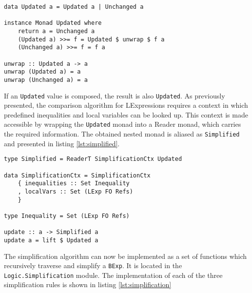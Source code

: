 \documentclass[12pt]{article}
\begin{document}
\begin{minipage}{\linewidth}
\begin{lstlisting}[style=c0, caption=the Updated monad, label=lst:updated]
data Updated a = Updated a | Unchanged a

instance Monad Updated where
    return a = Unchanged a
    (Updated a) >>= f = Updated $ unwrap $ f a
    (Unchanged a) >>= f = f a

unwrap :: Updated a -> a
unwrap (Updated a) = a
unwrap (Unchanged a) = a
\end{lstlisting}
\end{minipage}


If an \texttt{Updated} value is composed, the result is also \texttt{Updated}.
As previously presented, the comparison algorithm for LExpressions requires a context in which predefined inequalities and local variables can be looked up.
This context is made accessible by wrapping the \texttt{Updated} monad into a Reader monad, which carries the required information.
The obtained nested monad is aliased as \texttt{Simplified} and presented in listing \ref{lst:simplified}.

\begin{minipage}{\linewidth}
\begin{lstlisting}[style=c0, caption=the Simplified monad, label=lst:simplified]
type Simplified = ReaderT SimplificationCtx Updated

data SimplificationCtx = SimplificationCtx 
    { inequalities :: Set Inequality
    , localVars :: Set (LExp FO Refs)
    }
    
type Inequality = Set (LExp FO Refs)

update :: a -> Simplified a
update a = lift $ Updated a
\end{lstlisting}
\end{minipage}


The simplification algorithm can now be implemented as a set of functions which recursively traverse and simplify a \texttt{BExp}.
It is located in the \texttt{Logic.Simplification} module.
The implementation of each of the three simplification rules is shown in listing \ref{lst:simplification}
\end{document}
